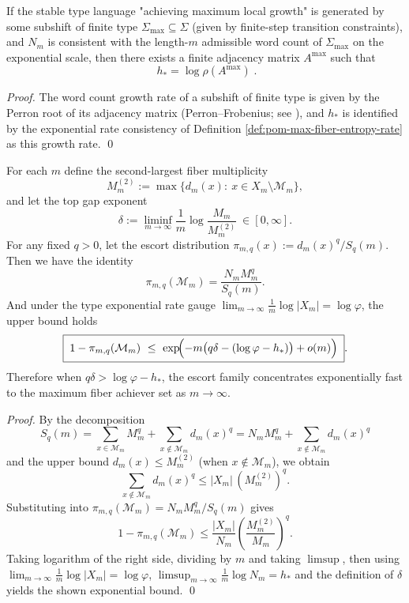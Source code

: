 \begin{corollary}\label{cor:pom-max-fiber-subshift-spectral-entropy}
If the stable type language "achieving maximum local growth" is generated by some subshift of finite type \(\Sigma_{\max}\subseteq\Sigma\) (given by finite-step transition constraints),
and \(N_m\) is consistent with the length-\(m\) admissible word count of \(\Sigma_{\max}\) on the exponential scale,
then there exists a finite adjacency matrix \(A^{\max}\) such that
\[
\boxed{\;
h_\ast=\log\rho(A^{\max})\; }.
\]
\end{corollary}
\begin{proof}
The word count growth rate of a subshift of finite type is given by the Perron root of its adjacency matrix (Perron--Frobenius; see \cite{LindMarcus1995}),
and \(h_\ast\) is identified by the exponential rate consistency of Definition \ref{def:pom-max-fiber-entropy-rate} as this growth rate. \qed
\end{proof}

\begin{proposition}\label{prop:pom-escort-freezing-gap-threshold}
For each \(m\) define the second-largest fiber multiplicity
\[
M_m^{(2)}:=\max\{d_m(x):\ x\in X_m\setminus\mathcal{M}_m\},
\]
and let the top gap exponent
\[
\delta:=\liminf_{m\to\infty}\frac{1}{m}\log\frac{M_m}{M_m^{(2)}}\ \in[0,\infty].
\]
For any fixed \(q>0\), let the escort distribution \(\pi_{m,q}(x):=d_m(x)^q/S_q(m)\).
Then we have the identity
\[
\pi_{m,q}(\mathcal{M}_m)=\frac{N_m M_m^q}{S_q(m)}.
\]
And under the type exponential rate gauge \(\lim_{m\to\infty}\frac{1}{m}\log|X_m|=\log\varphi\),
the upper bound holds
\[
\boxed{\;
1-\pi_{m,q}(\mathcal{M}_m)
\ \le\
\exp\!\Bigl(-m\bigl(q\delta-(\log\varphi-h_\ast)\bigr)+o(m)\Bigr)\; }.
\]
Therefore when \(q\delta>\log\varphi-h_\ast\), the escort family concentrates exponentially fast to the maximum fiber achiever set as \(m\to\infty\).
\end{proposition}
\begin{proof}
By the decomposition
\[
S_q(m)=\sum_{x\in\mathcal{M}_m}M_m^q+\sum_{x\notin\mathcal{M}_m}d_m(x)^q
=N_m M_m^q+\sum_{x\notin\mathcal{M}_m}d_m(x)^q
\]
and the upper bound \(d_m(x)\le M_m^{(2)}\) (when \(x\notin\mathcal{M}_m\)), we obtain
\[
\sum_{x\notin\mathcal{M}_m}d_m(x)^q\le |X_m|\,(M_m^{(2)})^q.
\]
Substituting into \(\pi_{m,q}(\mathcal{M}_m)=N_mM_m^q/S_q(m)\) gives
\[
1-\pi_{m,q}(\mathcal{M}_m)
\le
\frac{|X_m|}{N_m}\left(\frac{M_m^{(2)}}{M_m}\right)^q.
\]
Taking logarithm of the right side, dividing by \(m\) and taking \(\limsup\), then using
\(
\lim_{m\to\infty}\frac{1}{m}\log|X_m|=\log\varphi
\),
\(
\limsup_{m\to\infty}\frac{1}{m}\log N_m=h_\ast
\)
and the definition of \(\delta\) yields the shown exponential bound. \qed
\end{proof}

